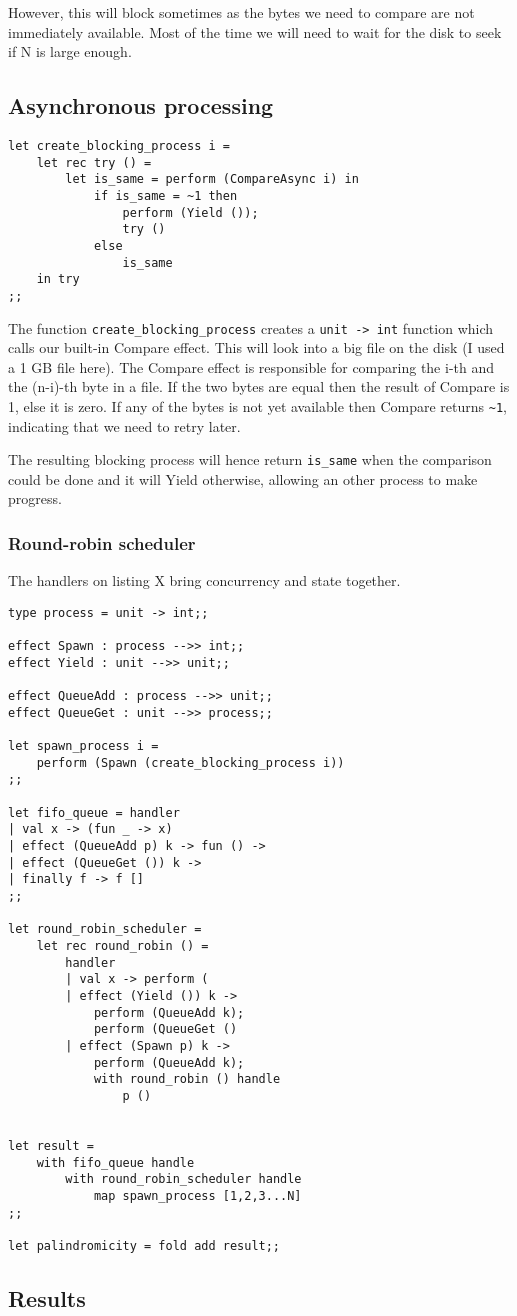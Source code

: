 \documentclass[class=article, crop=false]{standalone}
\begin{document}
However, this will block sometimes as the bytes we need to compare are not immediately
available. Most of the time we will need to wait for the disk to seek if N is large enough.

\subsection{Asynchronous processing}

\begin{verbatim}
let create_blocking_process i =
    let rec try () =
        let is_same = perform (CompareAsync i) in
            if is_same = ~1 then
                perform (Yield ());
                try ()
            else
                is_same
    in try
;;
\end{verbatim}

The function \verb|create_blocking_process| creates a \verb|unit -> int| function which calls
our built-in Compare effect. This will look into a big file on the disk (I used a 1 GB file
here). The Compare effect is responsible for comparing the i-th and the (n-i)-th byte in a file.
If the two bytes are equal then the result of Compare is 1, else it is zero. If any of the bytes
is not yet available then Compare returns \verb|~1|, indicating that we need to retry later.

The resulting blocking process will hence return \verb|is_same| when the comparison could be done and it
will Yield otherwise, allowing an other process to make progress.

\subsubsection{Round-robin scheduler}

The handlers on listing X bring concurrency and state together.

\begin{verbatim}
type process = unit -> int;;

effect Spawn : process -->> int;;
effect Yield : unit -->> unit;;

effect QueueAdd : process -->> unit;;
effect QueueGet : unit -->> process;;

let spawn_process i = 
    perform (Spawn (create_blocking_process i))
;;

let fifo_queue = handler
| val x -> (fun _ -> x)
| effect (QueueAdd p) k -> fun () ->
| effect (QueueGet ()) k ->
| finally f -> f []
;;

let round_robin_scheduler =
    let rec round_robin () =
        handler
        | val x -> perform (
        | effect (Yield ()) k ->
            perform (QueueAdd k);
            perform (QueueGet ()
        | effect (Spawn p) k ->
            perform (QueueAdd k);
            with round_robin () handle
                p ()


let result =
    with fifo_queue handle
        with round_robin_scheduler handle
            map spawn_process [1,2,3...N]
;;

let palindromicity = fold add result;;
\end{verbatim}

\subsection{Results}
\end{document}
